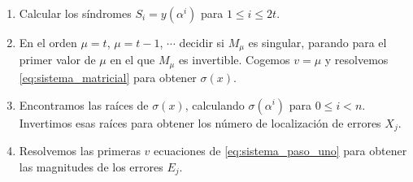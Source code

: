 \begin{enumerate}
	\item Calcular los síndromes $S_i = y(\alpha^i)$ para $ 1 \leq i \leq 2t$.
	\item En el orden $\mu = t$, $\mu = t-1$, $\cdots$ decidir si $M_\mu$ es singular, parando para el primer valor de $\mu$ en el que $M_\mu$ es invertible. Cogemos $v = \mu$ y resolvemos \ref{eq:sistema_matricial} para obtener $\sigma(x)$.
	\item Encontramos las raíces de $\sigma(x)$, calculando $\sigma(\alpha^i)$ para $ 0 \leq i < n$. Invertimos esas raíces para obtener los número de localización de errores $X_j$.
	\item Resolvemos las primeras $v$ ecuaciones de \ref{eq:sistema_paso_uno} para obtener las magnitudes de los errores $E_j$. 
\end{enumerate}

